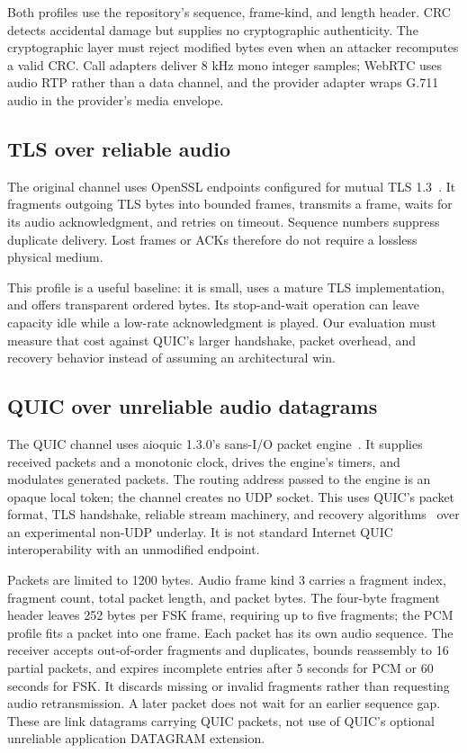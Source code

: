 Both profiles use the repository's sequence, frame-kind, and length header.
CRC detects accidental damage but supplies no cryptographic authenticity.
The cryptographic layer must reject modified bytes even when an attacker
recomputes a valid CRC. Call adapters deliver 8 kHz mono integer samples;
WebRTC uses audio RTP rather than a data channel, and the provider adapter
wraps G.711 audio in the provider's media envelope.

\subsection{TLS over reliable audio}
The original channel uses OpenSSL  endpoints configured for
mutual TLS 1.3~\cite{rfc8446}. It fragments outgoing TLS bytes into bounded
frames, transmits a frame, waits for its audio acknowledgment, and retries on
timeout. Sequence numbers suppress duplicate delivery. Lost frames or ACKs
therefore do not require a lossless physical medium.

This profile is a useful baseline: it is small, uses a mature TLS implementation,
and offers transparent ordered bytes. Its stop-and-wait operation can leave
capacity idle while a low-rate acknowledgment is played. Our evaluation must
measure that cost against QUIC's larger handshake, packet overhead, and recovery
behavior instead of assuming an architectural win.

\subsection{QUIC over unreliable audio datagrams}
The QUIC channel uses aioquic 1.3.0's sans-I/O packet engine~\cite{aioquic}.
It supplies received packets and a monotonic clock, drives the engine's timers,
and modulates generated packets. The routing address passed to the engine is
an opaque local token; the channel creates no UDP socket. This uses QUIC's
packet format, TLS handshake, reliable stream machinery, and recovery
algorithms~\cite{rfc9000,rfc9001,rfc9002} over an experimental non-UDP underlay.
It is not standard Internet QUIC interoperability with an unmodified endpoint.

Packets are limited to 1200 bytes. Audio frame kind 3 carries a fragment index,
fragment count, total packet length, and packet bytes. The four-byte fragment
header leaves 252 bytes per FSK frame, requiring up to five fragments; the PCM
profile fits a packet into one frame. Each packet has its own audio sequence.
The receiver accepts out-of-order fragments and duplicates, bounds reassembly
to 16 partial packets, and expires incomplete entries after 5 seconds for PCM
or 60 seconds for FSK. It discards missing or invalid fragments rather than
requesting audio retransmission. A later packet does not wait for an earlier
sequence gap. These are link datagrams carrying QUIC packets, not use of QUIC's
optional unreliable application DATAGRAM extension.

